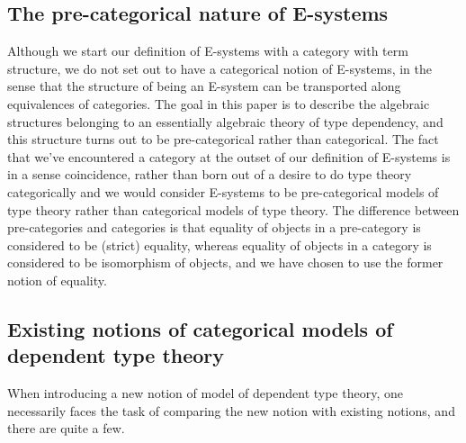 \subsection*{The pre-categorical nature of E-systems}
Although we start our definition of E-systems with a category with term structure,
we do not set out to have a categorical notion of E-systems, in the sense that the structure of
being an E-system can be transported along equivalences of categories. The goal
in this paper is to describe the algebraic structures belonging to an essentially
algebraic theory of type dependency, and this structure turns out to be pre-categorical
rather than categorical. The fact that we've encountered a category at the outset
of our definition of E-systems is in a sense coincidence, rather than born out
of a desire to do type theory categorically and we would consider E-systems to
be pre-categorical models of type theory rather than categorical models of type
theory. The difference between pre-categories and categories is that equality
of objects in a pre-category is considered to be (strict) equality, whereas
equality of objects in a category is considered to be isomorphism of objects,
and we have chosen to use the former notion of equality.

\subsection*{Existing notions of categorical models of dependent type theory}

When introducing a new notion of model of dependent type theory, one necessarily
faces the task of comparing the new notion with existing notions, and there are
quite a few. 

